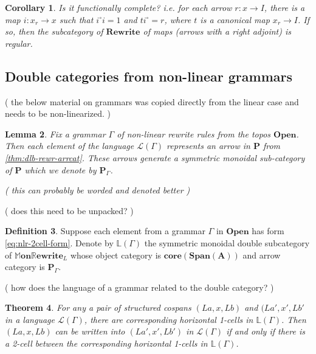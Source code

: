 \documentclass{amsart}
\newcommand{\LL}{\mathbb{L}}
\newcommand{\A}{\cat{A}}
\newcommand{\NonLinArrCat}{\cat{P}}
\newcommand{\core}{\mathbf{core}}
\newcommand{\cat}[1]{\mathbf{#1}}
\newcommand{\from}{\colon}
\newcommand{\Span}{\mathbf{Span}}
\newcommand{\OpenOb}{\mathbf{Open} }
\newcommand{\Rewrite}{\mathbf{Rewrite} }
\newcommand{\MMonRewrite}{ \mathbb{M}\mathbf{on}\mathbb{R}\mathbf{ewrite} }
\newcommand{\edit}[1]{\textcolor{editcolour}{(#1)}}
\newtheorem{theorem}{Theorem}[section]
\newtheorem{lemma}[theorem]{Lemma}
\newtheorem{corollary}[theorem]{Corollary}
\theoremstyle{remark}
\theoremstyle{definition}
\newtheorem{definition}[theorem]{Definition}
\begin{document}
\begin{corollary} \label{thm:bicat-rewr-function-compl}
  Is it functionally complete? i.e. for each arrow
  $ r \from x \to I $, there is a map $ i \from x_r \to x $ such that
  $ i^\circ i = 1 $ and $ t i^\circ = r $, where $ t $ is a canonical
  map $ x_r \to I $. If so, then the subcategory of $ \Rewrite $ of
  maps (arrows with a right adjoint) is regular.
\end{corollary}


\subsection{Double categories from non-linear grammars}
\label{sec:dblcats-nonlinr-gramrs}

\edit{ the below material on grammars was copied directly from the
  linear case and needs to be non-linearized. }

\begin{lemma} \label{thm:lr_open-objects-language}
  Fix a grammar $ \Gamma $ of non-linear rewrite rules from the topos
  $ \OpenOb $. Then each element of the language
  $ \mathcal{L}(\Gamma) $ represents an arrow in \( \NonLinArrCat \) from
  \ref{thm:dlb-rewr-arrcat}. These arrows generate a symmetric
  monoidal sub-category of \( \NonLinArrCat \) which we denote by
  \( \NonLinArrCat_\Gamma \).

  \edit{ this can probably be worded and denoted better }
\end{lemma}

\edit{ does this need to be unpacked? }
  
\begin{definition} \label{df:gramr-gen-dbl-cat}
  Suppose each element from a grammar $ \Gamma $ in $ \OpenOb $ has
  form \eqref{eq:nlr-2cell-form}.  Denote by $ \LL ( \Gamma ) $ the
  symmetric monoidal double subcategory of $ \MMonRewrite_{L} $ whose
  object category is \( \core ( \Span ( \A ) ) \) and arrow category
  is \( \NonLinArrCat_\Gamma \).
\end{definition}

\edit{ how does the language of a grammar related to the double category? } 

\begin{theorem}
  For any a pair of structured cospans \( (La,x,Lb) \) and
  \( (La',x',Lb' \) in a language \( \mathcal{L} (\Gamma) \), there
  are corresponding horizontal 1-cells in \( \LL (\Gamma) \). Then
  \( (La,x,Lb) \) can be written into \( (La',x',Lb') \) in
  \( \mathcal{L} (\Gamma) \) if and only if there is a 2-cell between
  the corresponding horizontal 1-cells in \( \LL (\Gamma) \).
\end{theorem}
\end{document}
